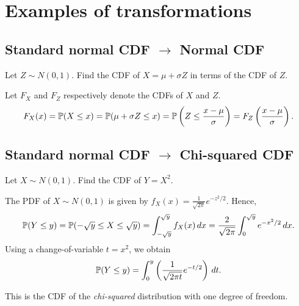 \chapter{Examples of transformations}\label{chap:transformations_examples}
\section{Standard normal CDF $\longrightarrow$ Normal CDF}

\begin{example}
Let $Z\sim N(0,1)$. Find the CDF of $X=\mu+\sigma Z$ in terms of the CDF of $Z$.
\end{example}
\begin{solution}
Let $F_X$ and $F_Z$ respectively denote the CDFs of $X$ and $Z$.
\[
F_X(x)
	= \mathbb{P}(X\leq x)
	= \mathbb{P}(\mu+\sigma Z\leq x)
	= \mathbb{P}\left(Z\leq\frac{x-\mu}{\sigma}\right)
	= F_Z\left(\frac{x-\mu}{\sigma}\right).
\]
\end{solution}

\section{Standard normal CDF $\longrightarrow$ Chi-squared CDF}
\begin{example}
Let $X\sim N(0,1)$. Find the CDF of $Y=X^2$.
\end{example}
\begin{solution}
The PDF of $X\sim N(0,1)$ is given by $f_X(x) = \displaystyle\frac{1}{\sqrt{2\pi}}e^{-z^2/2}$. Hence,
\[
\mathbb{P}(Y\leq y) 
	= \mathbb{P}(-\sqrt{y}\leq X\leq \sqrt{y})
	= \int_{-\sqrt{y}}^{\sqrt{y}} f_X(x)\,dx
	= \frac{2}{\sqrt{2\pi}}\int_0^{\sqrt{y}} e^{-x^2/2}\,dx.
\]
Using a change-of-variable $t=x^2$, we obtain
\[
\mathbb{P}(Y\leq y) 
	= \int_0^{y} \left(\frac{1}{\sqrt{2\pi t}} e^{-t/2}\right)\,dt.
\]

This is the CDF of the \emph{chi-squared} distribution with one degree of freedom.
\end{solution}


